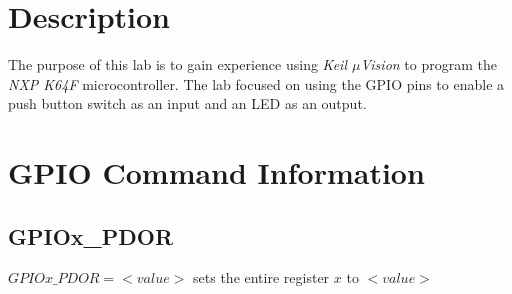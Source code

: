 \documentclass[CMPE]{KGCOEReport}
\begin{document}
\maketitle

\iffalse %
\tableofcontents	%
\newpage			%

\section*{Abstract}
\addcontentsline{toc}{section}{Abstract}
		
\section*{Design Methodology}
\addcontentsline{toc}{section}{Design Methodology}

\section*{Results \& Analysis}
\addcontentsline{toc}{section}{Results \& Analysis}

\section*{Conclusion}
\addcontentsline{toc}{section}{Conclusion}

\fi %

\section*{Description}
The purpose of this lab is to gain experience using \emph{Keil $\mu$Vision} to program the \emph{NXP K64F} microcontroller. The lab focused on using the GPIO pins to enable a push button switch as an input and an LED as an output.

\section*{GPIO Command Information}

\subsection*{GPIOx\_PDOR}
$GPIOx\_PDOR = <value>$ sets the entire register $x$ to $<value>$
\end{document}

